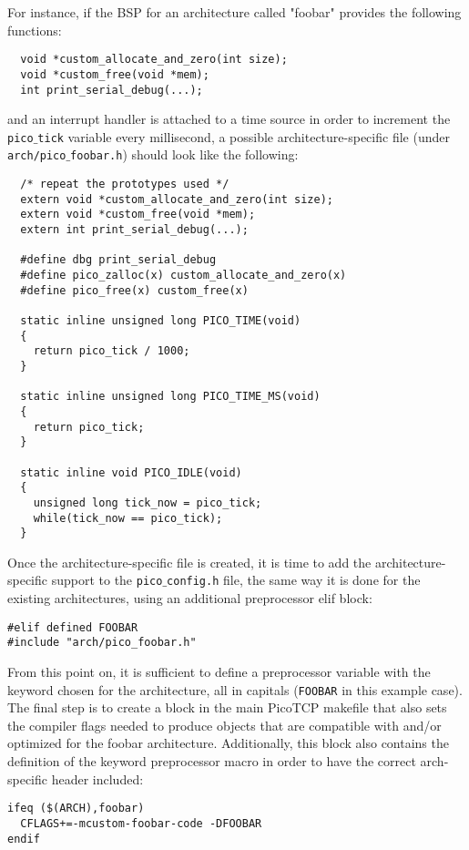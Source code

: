 For instance, if the BSP for an architecture called "foobar" provides the 
following functions:
\begin{verbatim}
  void *custom_allocate_and_zero(int size);
  void *custom_free(void *mem);
  int print_serial_debug(...);
\end{verbatim}
and an interrupt handler is attached to a time source in order to increment
the \texttt{pico$\_$tick} variable every millisecond, a possible architecture-specific 
file (under \texttt{arch/pico$\_$foobar.h}) should look like the following:

\begin{verbatim}
  /* repeat the prototypes used */
  extern void *custom_allocate_and_zero(int size);
  extern void *custom_free(void *mem);
  extern int print_serial_debug(...);

  #define dbg print_serial_debug
  #define pico_zalloc(x) custom_allocate_and_zero(x)
  #define pico_free(x) custom_free(x)

  static inline unsigned long PICO_TIME(void)
  {
    return pico_tick / 1000;
  }

  static inline unsigned long PICO_TIME_MS(void)
  {
    return pico_tick;
  }

  static inline void PICO_IDLE(void)
  {
    unsigned long tick_now = pico_tick;
    while(tick_now == pico_tick);
  }

\end{verbatim}

Once the architecture-specific file is created, it is time to add the
architecture-specific support to the \texttt{pico$\_$config.h} file, the
same way it is done for the existing architectures, using an additional 
preprocessor elif block:

\begin{verbatim}
#elif defined FOOBAR
#include "arch/pico_foobar.h"
\end{verbatim}

From this point on, it is sufficient to define a preprocessor variable with
the keyword chosen for the architecture, all in capitals (\texttt{FOOBAR} in 
this example case). The final step is to create a block in the main PicoTCP 
makefile that also sets the compiler flags needed to produce objects that are
compatible with and/or optimized for the foobar architecture. Additionally,
this block also contains the definition of the keyword preprocessor macro in
order to have the correct arch-specific header included:

\begin{verbatim}
ifeq ($(ARCH),foobar)
  CFLAGS+=-mcustom-foobar-code -DFOOBAR
endif
\end{verbatim}

